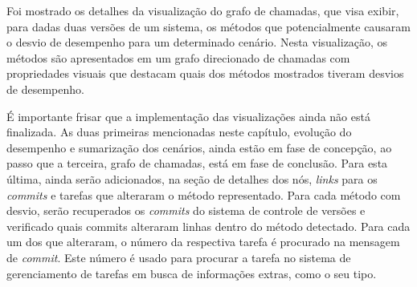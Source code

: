 Foi mostrado os detalhes da visualização do grafo de chamadas, que visa exibir, para dadas duas versões de um sistema, os métodos que potencialmente causaram o desvio de desempenho para um determinado cenário. Nesta visualização, os métodos são apresentados em um grafo direcionado de chamadas com propriedades visuais que destacam quais dos métodos mostrados tiveram desvios de desempenho.

É importante frisar que a implementação das visualizações ainda não está finalizada. As duas primeiras mencionadas neste capítulo, evolução do desempenho e sumarização dos cenários, ainda estão em fase de concepção, ao passo que a terceira, grafo de chamadas, está em fase de conclusão. Para esta última, ainda serão adicionados, na seção de detalhes dos nós, \textit{links} para os \textit{commits} e tarefas que alteraram o método representado. Para cada método com desvio, serão recuperados os \textit{commits} do sistema de controle de versões e verificado quais commits alteraram linhas dentro do método detectado. Para cada um dos que alteraram, o número da respectiva tarefa é procurado na mensagem de \textit{commit}. Este número é usado para procurar a tarefa no sistema de gerenciamento de tarefas em busca de informações extras, como o seu tipo.